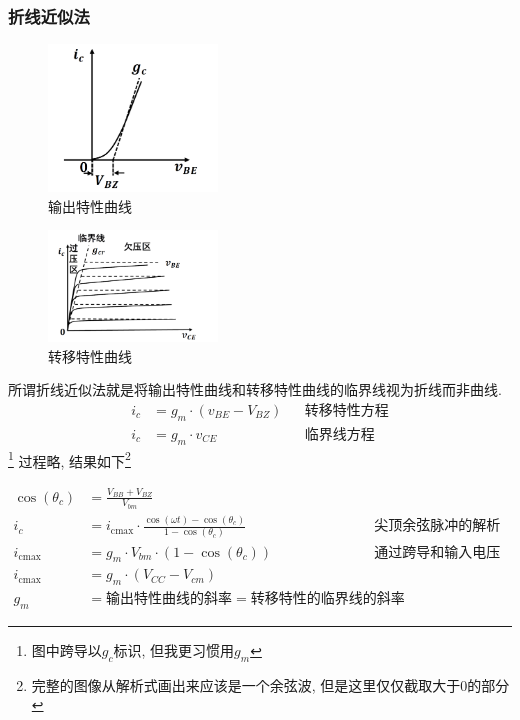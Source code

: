 \documentclass[a4paper]{report}
\begin{document}
\subsubsection{折线近似法}
\begin{figure}[H]
\centering
\includegraphics[width=0.4\textwidth]{power_amp_graph_4.png}
\caption{输出特性曲线}
\end{figure}
\begin{figure}[H]
\centering
\includegraphics[width=0.4\textwidth]{power_amp_graph_5.png}
\caption{转移特性曲线}
\end{figure}
所谓折线近似法就是将输出特性曲线和转移特性曲线的临界线视为折线而非曲线. 
\begin{align*}
  i_c&=g_m\cdot(v_{BE}-V_{BZ}) &&\text{转移特性方程}\\
  i_c&=g_m\cdot v_{CE}&&\text{临界线方程}
\end{align*}\footnote{图中跨导以$g_c$标识, 但我更习惯用$g_m$}
过程略, 结果如下\footnote{完整的图像从解析式画出来应该是一个余弦波, 但是这里仅仅截取大于0的部分}

\begin{align*}
  \cos(\theta_c)&=\frac{V_{BB}+V_{BZ}}{V_{bm}}\\
  i_c&=i_{\text{cmax}}\cdot \frac{\cos(\omega t)-\cos(\theta_c)}{1-\cos(\theta_c)}&&\text{尖顶余弦脉冲的解析式}\\
  i_{\text{cmax}}&=g_m\cdot V_{bm}\cdot (1-\cos(\theta_c))&&\text{通过跨导和输入电压的最大值求出}\\
  i_\text{cmax}&=g_m\cdot (V_{CC}-V_{cm})\\
  g_m&=\text{输出特性曲线的斜率}=\text{转移特性的临界线的斜率}
\end{align*}
\end{document}
